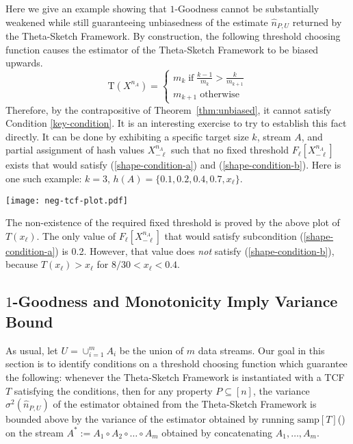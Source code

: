 \documentclass{article}
\newcommand{\xnml}{X^{n_A}_{-\ell}}
\newcommand{\xhatfull}{F_\ell[X^{n_A}_{-\ell}]}
\newcommand{\romTS}{\hat{n}}
\newcommand{\samp}{\mathrm{samp}}
\begin{document}
\label{section:negative-example}
Here we give an example showing
that $1$-Goodness cannot be substantially weakened while still guaranteeing unbiasedness of the estimate 
 $\romTS_{P, U}$
returned by the Theta-Sketch Framework. 
By construction, the following threshold choosing function causes the 
estimator of the Theta-Sketch Framework to be biased upwards. 
\begin{equation}
\mathrm{T}(X^{n_A}) = 
\left\{
\begin{array}{l}
m_k     \;\mathrm{if}\; \frac{k-1}{m_k} > \frac{k}{m_{k+1}} \\
m_{k+1} \;\mathrm{otherwise}
\end{array}\right.
\end{equation}
Therefore, by the contrapositive of Theorem~\ref{thm:unbiased},
it cannot satisfy Condition \ref{key-condition}. 
It is an interesting exercise to try to 
establish this fact directly. It can be done by exhibiting a specific
target size $k$, stream $A$, and partial assignment of hash values $\xnml$ 
such that no fixed threshold $\xhatfull$ exists that would satisfy
(\ref{shape-condition-a}) and (\ref{shape-condition-b}). Here is one such 
example: $k=3$, $h(A) = \{0.1, 0.2, 0.4, 0.7, x_\ell\}$. 
\begin{center}
\texttt{[image: neg-tcf-plot.pdf]}
\end{center}
The non-existence of the required fixed threshold is proved
by the above plot of $T(x_\ell)$. The only
value of $\xhatfull$ that would satisfy subcondition (\ref{shape-condition-a}) is 0.2.
However, that value does {\em not} satisfy (\ref{shape-condition-b}), 
because $T(x_\ell) > x_\ell$ for $8/30 < x_\ell < 0.4$.


\subsection{$1$-Goodness and Monotonicity Imply Variance Bound}
\label{sec:variance}

As usual, let $U=\cup_{i=1}^m A_i$ be the union of $m$ data streams. 
Our goal in this section is to identify conditions on a threshold choosing function which guarantee the following: whenever the Theta-Sketch Framework is instantiated with a TCF $T$ satisfying the conditions,
then for any property $P \subseteq [n]$, the variance $\sigma^2(\romTS_{P, U})$ of the estimator obtained from the Theta-Sketch Framework
is bounded above by 
the variance of the estimator obtained by running $\samp[T]$() on the stream $A^* := A_1 \circ A_2 \circ \dots \circ A_m$ obtained by concatenating $A_1, \dots, A_m$. 
\end{document}
